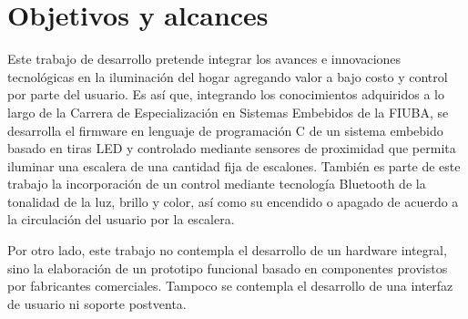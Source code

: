 \section{Objetivos y alcances}
\label{sec:objetivos}

Este trabajo de desarrollo pretende integrar los avances e innovaciones tecnológicas en la iluminación del hogar agregando valor a bajo costo y control por parte del usuario. Es así que, integrando los conocimientos adquiridos a lo largo de la Carrera de Especialización en Sistemas Embebidos de la FIUBA, se desarrolla el firmware en lenguaje de programación C de un sistema embebido basado en tiras LED y controlado mediante sensores de proximidad que permita iluminar una escalera de una cantidad fija de escalones. También es parte de este trabajo la incorporación de un control mediante tecnología Bluetooth de la tonalidad de la luz, brillo y color, así como su encendido o apagado de acuerdo a la circulación del usuario por la escalera.

Por otro lado, este trabajo no contempla el desarrollo de un hardware integral, sino la elaboración de un prototipo funcional basado en componentes provistos por fabricantes comerciales. Tampoco se contempla el desarrollo de una interfaz de usuario ni soporte postventa.
